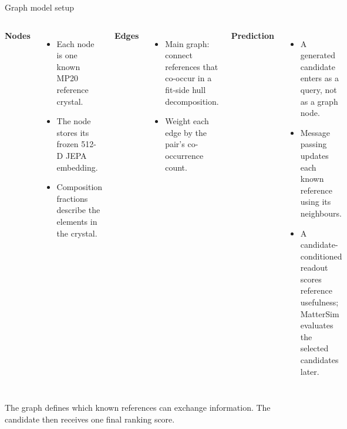 \documentclass[10pt,aspectratio=169]{beamer}
\begin{document}
\begin{frame}{Graph model setup}
\begin{columns}[T]
\textbf{Nodes}
\begin{itemize}\setlength\itemsep{2mm}
\item Each node is one known MP20 reference crystal.
\item The node stores its frozen 512-D JEPA embedding.
\item Composition fractions describe the elements in the crystal.
\end{itemize}
\textbf{Edges}
\begin{itemize}\setlength\itemsep{2mm}
\item Main graph: connect references that co-occur in a fit-side hull decomposition.
\item Weight each edge by the pair's co-occurrence count.
\end{itemize}
\textbf{Prediction}
\begin{itemize}\setlength\itemsep{2mm}
\item A generated candidate enters as a query, not as a graph node.
\item Message passing updates each known reference using its neighbours.
\item A candidate-conditioned readout scores reference usefulness; MatterSim evaluates the selected candidates later.
\end{itemize}
\end{columns}
\vspace{3mm}
\centering\small
The graph defines which known references can exchange information. The candidate then receives one final ranking score.
\end{frame}
\end{document}
